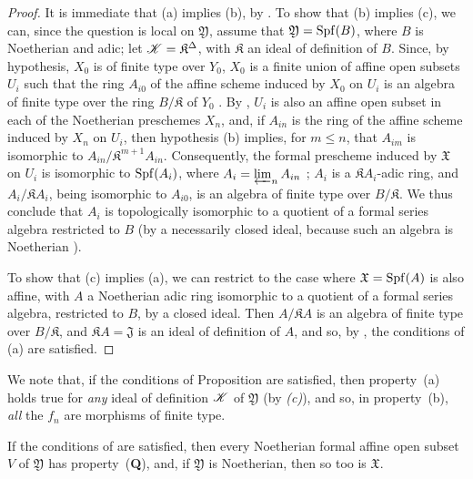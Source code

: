 \begin{proof}
It is immediate that (a) implies (b), by .
To show that (b) implies (c), we can, since the question is local on $\mathfrak{Y}$, assume that $\mathfrak{Y}=\operatorname{Spf}(B)$, where $B$ is Noetherian and adic;
let $\mathscr{K}=\mathfrak{K}^\Delta$, with $\mathfrak{K}$ an ideal of definition of $B$.
Since, by hypothesis, $X_0$ is of finite type over $Y_0$, $X_0$ is a finite union of affine open subsets $U_i$ such that the ring $A_{i0}$ of the affine scheme induced by $X_0$ on $U_i$ is an algebra of finite type over the ring $B/\mathfrak{K}$ of $Y_0$ .
By , $U_i$ is also an affine open subset in each of the Noetherian preschemes $X_n$, and, if $A_{in}$ is the ring of the affine scheme induced by $X_n$ on $U_i$, then hypothesis (b) implies, for $m\leq n$, that $A_{im}$ is isomorphic to $A_{in}/\mathfrak{K}^{m+1}A_{in}$.
Consequently, the formal prescheme induced by $\mathfrak{X}$ on $U_i$ is isomorphic to $\operatorname{Spf}(A_i)$, where $A_i=\varprojlim_n A_{in}$ ;
$A_i$ is a $\mathfrak{K}A_i$-adic ring, and $A_i/\mathfrak{K}A_i$, being isomorphic to $A_{i0}$, is an algebra of finite type over $B/\mathfrak{K}$.
We thus conclude  that $A_i$ is topologically isomorphic to a quotient of a formal series algebra restricted to $B$ (by a necessarily closed ideal, because such an algebra is Noetherian ).

To show that (c) implies (a), we can restrict to the case where $\mathfrak{X}=\operatorname{Spf}(A)$ is also affine, with $A$ a Noetherian adic ring isomorphic to a quotient of a formal series algebra, restricted to $B$, by a closed ideal.
Then  $A/\mathfrak{K}A$ is an algebra of finite type over $B/\mathfrak{K}$, and $\mathfrak{K}A=\mathfrak{J}$ is an ideal of definition of $A$, and so, by , the conditions of (a) are satisfied.
\end{proof}

We note that, if the conditions of Proposition  are satisfied, then property~(a) holds true for \emph{any} ideal of definition $\mathscr{K}$ of $\mathfrak{Y}$ (by \emph{(c)}), and so, in property~(b), \emph{all} the $f_n$ are morphisms of finite type.

\begin{corollary}[10.13.2]
\label{I.10.13.2}
If the conditions of  are satisfied, then every Noetherian formal affine open subset $V$ of $\mathfrak{Y}$ has property~(\textbf{Q}), and, if $\mathfrak{Y}$ is Noetherian, then so too is $\mathfrak{X}$.
\end{corollary}

